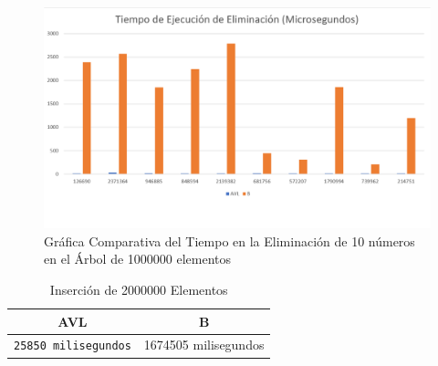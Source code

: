 \documentclass[acmsmall]{acmart}
\begin{document}
\begin{figure}[ht]
  \centering
  \caption{Gráfica Comparativa del Tiempo en la Eliminación de 10 números en el Árbol de 1000000 elementos}

  \includegraphics[angle=0,scale=0.5]{1000000.3 elem.png}
  
\end{figure}




\begin{table}[htbp]
\begin{center}
  \caption{Inserción de 2000000 Elementos}
  \begin{tabular}{cc}
    \toprule
    AVL & B\\
    \midrule
    \texttt{25850 milisegundos} & 1674505 milisegundos \\
    \bottomrule
  \end{tabular}
  \end{center}
\end{table}
\end{document}
